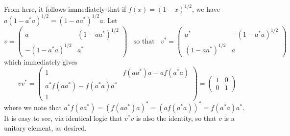 \documentclass[aps,pra,showpacs,notitlepage,onecolumn,superscriptaddress,nofootinbib]{revtex4-1}
\theoremstyle{definition}
\begin{document}
\noindent From here, it follows immediately that if $f(x) = (1 - x)^{1/2}$, we have $a (1 - a^{*} a)^{1/2} = (1 - a a^{*})^{1/2} a$. Let
\begin{equation}
  v = \begin{pmatrix} a &  (1 - a a^{*})^{1/2} \\ -(1 - a^{*} a)^{1/2} & a^{*} \end{pmatrix} \ \ \ \ \text{so that} \ \ \ \ v^{*} = \begin{pmatrix} a^{*} &   -(1 - a^{*} a)^{1/2} \\ (1 - a a^{*})^{1/2}  & a \end{pmatrix}
\end{equation}
which immediately gives
\begin{equation}
  vv^{*} = \begin{pmatrix} 1 & f(a a^{*}) a - a f(a^{*} a) \\ a^{*} f(a a^{*}) - f(a^{*} a) a^{*} \\ 1 \end{pmatrix} = \begin{pmatrix} 1 & 0 \\ 0 & 1 \end{pmatrix}
\end{equation}
where we note that $a^{*} f(a a^{*}) = (f(a a^{*}) a)^{*} = (a f(a^{*} a))^{*} = f(a^{*} a) a^{*}$. It is easy to see, via identical logic that $v^{*} v$ is also the identity,
so that $v$ is a unitary element, as desired.
\newline
\end{document}
